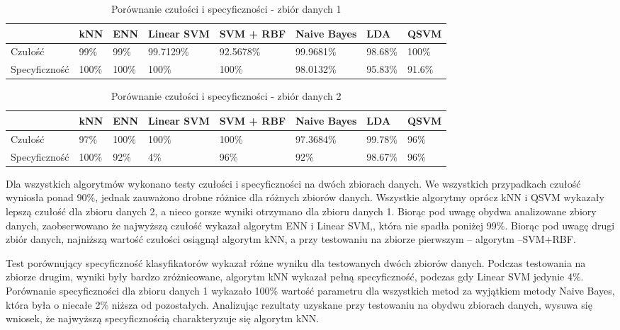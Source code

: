 \documentclass[[10pt,a4paper]{article}
\begin{document}
\begin{table}[h]
\centering
\caption{Porównanie czułości i specyficzności - zbiór danych 1}
\label{sens2}
\begin{tabular}{|l|l|l|l|l|l|l|l|}
\hline
              & kNN & ENN & Linear SVM & SVM + RBF & Naive Bayes & LDA &QSVM\\ \hline
Czułość       &  99\%   &  99\%   &    99.7129\%        &     92.5678\%       &   99.9681\%   & 98.68\%      & 100\% \\ \hline
Specyficzność &  100\%   &  100\%   &     100\%       &      100\%     &   98.0132\%     & 95.83\% & 91.6\%    \\ \hline
\end{tabular}
\end{table}

\begin{table}[h]
\centering
\caption{Porównanie czułości i specyficzności - zbiór danych 2}
\label{sens1}
\begin{tabular}{|l|l|l|l|l|l|l|l|}
\hline
              & kNN & ENN & Linear SVM & SVM + RBF & Naive Bayes & LDA & QSVM\\ \hline
Czułość       &  97\%  & 100\%  &    100\%    &    100\%   &      97.3684\% & 99.78\%  & 96\%   \\ \hline
Specyficzność &   100\%   &  92\%   &     4\%       &     96\%   &       92\%  & 98.67\%  &96\%  \\ \hline
\end{tabular}
\end{table}



Dla wszystkich algorytmów wykonano testy czułości i specyficzności na dwóch zbiorach danych. We wszystkich przypadkach czułość wyniosła ponad 90\%, jednak zauważono drobne różnice dla różnych zbiorów danych. Wszystkie algorytmy oprócz kNN i QSVM wykazały lepszą czułość dla zbioru danych 2, a nieco gorsze wyniki otrzymano dla zbioru danych 1. Biorąc pod uwagę obydwa analizowane zbiory danych, zaobserwowano że najwyższą czułość wykazał algorytm ENN i Linear SVM,, która nie spadła poniżej 99\%. Biorąc pod uwagę drugi zbiór danych, najniższą wartość czułości osiągnął algorytm kNN, a przy testowaniu na zbiorze pierwszym – algorytm –SVM+RBF.

Test porównujący specyficzność klasyfikatorów wykazał różne wyniku dla testowanych dwóch zbiorów danych. Podczas testowania na zbiorze drugim, wyniki były bardzo zróżnicowane, algorytm kNN wykazał pełną specyficzność, podczas gdy Linear SVM jedynie 4\%. Porównanie specyficzności dla zbioru danych 1 wykazało 100\% wartość parametru dla wszystkich metod za wyjątkiem metody Naive Bayes, która była o niecałe 2\% niższa od pozostałych. Analizując rezultaty uzyskane przy testowaniu na obydwu zbiorach danych, wysuwa się wniosek, że najwyższą specyficznością charakteryzuje się algorytm kNN. 
\end{document}
